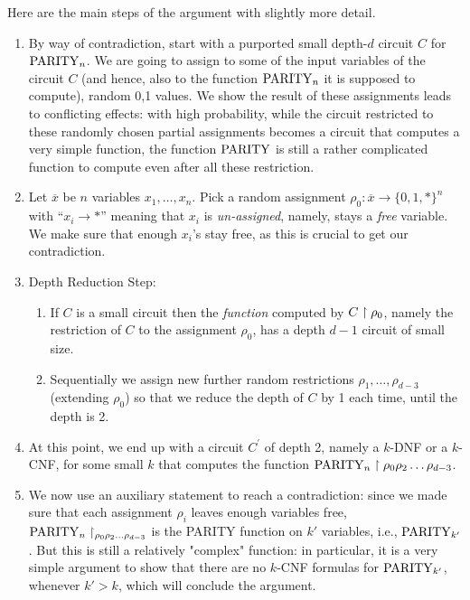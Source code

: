 \medskip
Here are the main steps of the argument with slightly more detail.


\begin{enumerate}
\item By  way of contradiction, start with a purported small depth-$d$ circuit $C$ for $\operatorname{PARITY}_n$.
We are going to assign to some of the input variables of the circuit $C$ (and hence, also to the function $\operatorname{PARITY}_n$ it is supposed to compute), random 0,1 values. We show the result of these assignments leads to conflicting effects: with high probability, while the circuit restricted to these randomly chosen partial assignments becomes a circuit that computes a very simple function, the function $\operatorname{PARITY}$ is still a rather complicated function to compute even after all these restriction.
\item Let $\overline x$ be $n$ variables $x_1,\dots,x_n$. Pick a random assignment $\rho_0: \overline x \rightarrow\{0,1, *\}^n$ with ``$x_i \rightarrow *$'' meaning that $x_i$ is \emph{un-assigned}, namely, stays a \emph{free} variable. We make sure that enough $x_i$'s stay  free, as this is crucial to get our contradiction.
\label{it:two-165}

\item Depth Reduction Step: 

\begin{enumerate}
\item 
If $C$ is a small circuit then the \emph{function} computed by $C\upharpoonright\rho_0$, namely the restriction of $C$ to the assignment $\rho_0$, has a depth  $d-1$ circuit of small size. 

\item
Sequentially we assign new further random restrictions $\rho_1,\dots,\rho_{d-3}$
 (extending $\rho_0$) so that we reduce the depth of $C$ by 1 each time, until the depth is 2.
\end{enumerate}

\item 
At this point, we end up with a circuit $C^{\prime}$ of depth 2, namely a $k$-DNF or a $k$-CNF, for some small $k$ that computes the function 
$\operatorname{PARITY}_n\upharpoonright\rho_0\rho_2\ldots\rho_{d-3}$.

\item
We now use an auxiliary statement to reach a contradiction: since we made sure that each assignment $\rho_i$ leaves enough variables free, 
$\operatorname{PARITY}_n\upharpoonright_{\rho_0\rho_2\ldots\rho_{d-3}}$ is the PARITY function on $k'$ variables, i.e., $\operatorname{PARITY}_{k'}$. But this is still a relatively "complex" function:
in particular, it is a very simple argument to show that there are no $k$-CNF formulas for $\operatorname{PARITY}_{k'}$, whenever $k'>k$, which will conclude the argument.
\label{it:final-step:269}
\end{enumerate}


